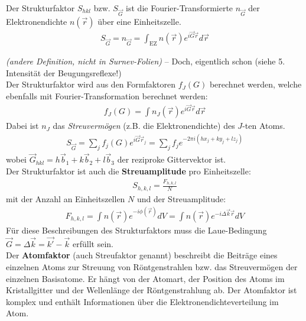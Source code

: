 \label{q:27}

Der Strukturfaktor $S_{hkl}$ bzw. $S_{\vec{G}}$ ist die Fourier-Transformierte $n_{\Vec{G}}$ der Elektronendichte $n(\vec{r})$ über eine Einheitszelle. 
\begin{align}
    S_{\vec{G}} = n_{\vec{G}} = \int_{\text{EZ}} n(\vec{r}) e^{i \vec{G} \vec{r}} d\vec{r} 
\end{align}

\textit{(andere Definition, nicht in Surnev-Folien)} -- Doch, eigentlich schon (siehe 5. Intensität der Beugungsreflexe!) \\
Der Strukturfaktor wird aus den Formfaktoren $f_J(G)$ berechnet werden, welche ebenfalls mit Fourier-Transformation berechnet werden:
\begin{align}
f_J(G) = \int n_J(\vec{r}) e^{i \vec{G} \vec{r}} d\vec{r}
\end{align}
Dabei ist $n_J$ das \textit{Streuvermögen} (z.B. die Elektronendichte) des $J$-ten Atoms.
\begin{align}
S_{\vec{G}} = \sum_j f_j (G) e^{i \vec{G} \vec{r}_j} = \sum_j f_j e^{-2 \pi i (hx_j + ky_j + l z_j)}
\end{align}
wobei $\vec{G}_{hkl} = h\vec{b}_1+k\vec{b}_2+l\vec{b}_3$ der reziproke Gittervektor ist. \\




Der Strukturfaktor ist auch die \textbf{Streuamplitude} pro Einheitszelle:
\begin{align}
S_{h,k,l} = \frac{F_{h,k,l}}{N}
\end{align}
mit der Anzahl an Einheitszellen $N$ und der Streuamplitude:
\begin{align}
    F_{h,k,l} = \int n(\vec{r}) e^{-i \phi(\vec{r})} dV = \int n(\vec{r}) e^{-i \Delta \vec{k} \vec{r}} dV
\end{align}
Für diese Beschreibungen des Strukturfaktors muss die Laue-Bedingung $\vec{G} = \Delta \vec{k} = \vec{k'}-\vec{k}$ erfüllt sein. \bigskip \\

Der \textbf{Atomfaktor} (auch Streufaktor genannt) beschreibt die Beiträge eines einzelnen Atoms zur Streuung von Röntgenstrahlen bzw. das Streuvermögen der einzelnen Basisatome. Er hängt von der Atomart, der Position des Atoms im Kristallgitter und der Wellenlänge der Röntgenstrahlung ab. Der Atomfaktor ist komplex und enthält Informationen über die Elektronendichteverteilung im Atom.

